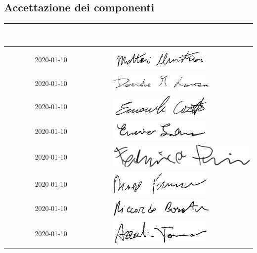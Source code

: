 \subsection{Accettazione dei componenti}
{
	\renewcommand{\arraystretch}{2}
	\begin{longtable}{ C{5cm} C{4cm} C{5cm} }
		\textcolor{white}{\textbf{Nome}} & \textcolor{white}{\textbf{Data di Accettazione}} & \textcolor{white}{\textbf{Firma}}\\	\endhead
		
		
		\MC{} & 2020-01-10 & \includegraphics[scale=0.70]{Sezioni/Firme/Christian.png}\\
		\LD{} & 2020-01-10 & \includegraphics[scale=0.60]{Sezioni/Firme/Davide.png}\\
		\CE{} & 2020-01-10 & \includegraphics[scale=0.70]{Sezioni/Firme/Emanuele.png} \\
		\SE{} & 2020-01-10 & \includegraphics[scale=0.70]{Sezioni/Firme/Enrico.png}\\
		\PF{} & 2020-01-10 & \includegraphics[scale=0.50]{Sezioni/Firme/Federico.png}\\
		\DF{} & 2020-01-10 & \includegraphics[scale=0.70]{Sezioni/Firme/Francesco.png} \\
		\BR{} & 2020-01-10& \includegraphics[scale=0.70]{Sezioni/Firme/Riccardo.png} \\
		\AT{} & 2020-01-10 & \includegraphics[scale=0.70]{Sezioni/Firme/Tommaso.png} \\
		
		
	\end{longtable}
}

